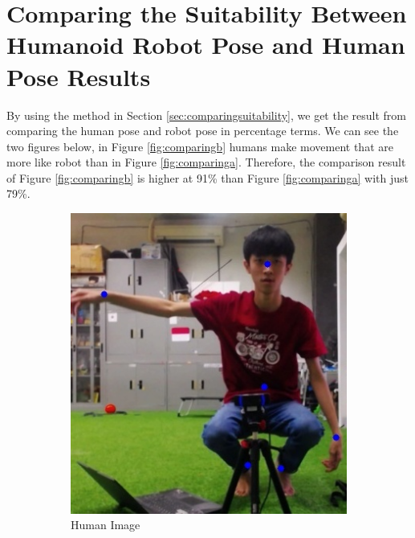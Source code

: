 \section{Comparing the Suitability Between Humanoid Robot Pose and Human Pose Results}
\label{sec:comparingsuitabilityresults}

By using the method in Section \ref{sec:comparingsuitability}, we get the result from comparing the human pose and robot pose in percentage terms.
We can see the two figures below, in Figure \ref{fig:comparingb} humans make movement that are more like robot than in Figure \ref{fig:comparinga}.
Therefore, the comparison result of Figure \ref{fig:comparingb} is higher at 91\% than Figure \ref{fig:comparinga} with just 79\%.

\begin{figure}
  \centering
  \begin{subfigure}[b]{0.4\textwidth}
      \centering
      \includegraphics[width=\textwidth]{gambar/human_10_result.jpg}
      \caption{Human Image}
      \label{fig:humanimagea}
  \end{subfigure}
  \hfill
  \begin{subfigure}[b]{0.4\textwidth}
      \centering

\end{subfigure}
\end{figure}
